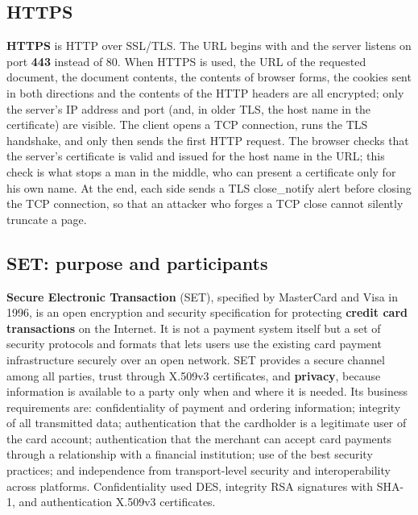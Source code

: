 \subsection{HTTPS \new}

\textbf{HTTPS} is HTTP over SSL/TLS. The URL begins with  and the server listens on port \textbf{443} instead of 80. When HTTPS is used, the URL of the requested document, the document contents, the contents of browser forms, the cookies sent in both directions and the contents of the HTTP headers are all encrypted; only the server's IP address and port (and, in older TLS, the host name in the certificate) are visible. The client opens a TCP connection, runs the TLS handshake, and only then sends the first HTTP request. The browser checks that the server's certificate is valid and issued for the host name in the URL; this check is what stops a man in the middle, who can present a certificate only for his own name. At the end, each side sends a TLS close\_notify alert before closing the TCP connection, so that an attacker who forges a TCP close cannot silently truncate a page.

\subsection{SET: purpose and participants \new}\label{sec:set}

\textbf{Secure Electronic Transaction} (SET), specified by MasterCard and Visa in 1996, is an open encryption and security specification for protecting \textbf{credit card transactions} on the Internet. It is not a payment system itself but a set of security protocols and formats that lets users use the existing card payment infrastructure securely over an open network. SET provides a secure channel among all parties, trust through X.509v3 certificates, and \textbf{privacy}, because information is available to a party only when and where it is needed. Its business requirements are: confidentiality of payment and ordering information; integrity of all transmitted data; authentication that the cardholder is a legitimate user of the card account; authentication that the merchant can accept card payments through a relationship with a financial institution; use of the best security practices; and independence from transport-level security and interoperability across platforms. Confidentiality used DES, integrity RSA signatures with SHA-1, and authentication X.509v3 certificates.


